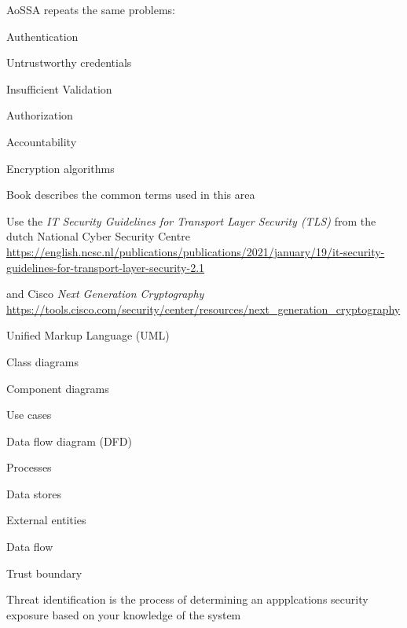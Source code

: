 \documentclass[Screen16to9,17pt]{foils}
\begin{document}

\begin{list2}
\item AoSSA repeats the same problems:
\item Authentication
\item Untrustworthy credentials
\item Insufficient Validation
\item Authorization
\item Accountability
\end{list2}



\begin{list2}
\item Encryption algorithms
\item Book describes the common terms used in this area
\item Use the \emph{IT Security Guidelines for Transport Layer Security (TLS)} from the dutch National Cyber Security Centre\\
{\footnotesize\url{https://english.ncsc.nl/publications/publications/2021/january/19/it-security-guidelines-for-transport-layer-security-2.1}}

\item and Cisco \emph{Next Generation Cryptography}\\
{\footnotesize\url{https://tools.cisco.com/security/center/resources/next_generation_cryptography}}
\end{list2}





\begin{list2}
\item Unified Markup Language (UML)
\item Class diagrams
\item Component diagrams
\item Use cases
\item Data flow diagram (DFD)
\item Processes
\item Data stores
\item External entities
\item Data flow
\item Trust boundary
\item Threat identification is the process of determining an appplcations security exposure based on your knowledge of the system
\end{list2}
\end{document}
